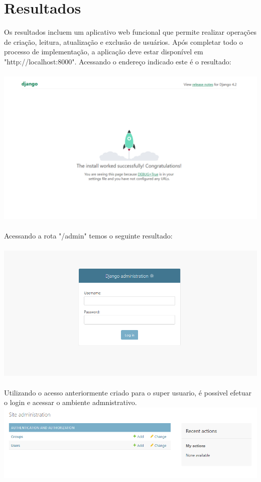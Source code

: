 \documentclass[11pt]{article} %
\begin{document}
\section{Resultados}
Os resultados incluem um aplicativo web funcional que permite  realizar operações de criação, leitura, atualização e exclusão de usuários.
Após completar todo o processo de implementação, a aplicação deve estar disponível em "http://localhost:8000". Acessando o endereço indicado este é o resultado:\\\\
\includegraphics[width=150mm,scale=0.7]{images/s9.png}\\\\
Acessando a rota "/admin" temos o seguinte resultado:\\\\
\includegraphics[width=150mm,scale=0.7]{images/s10.PNG}\\\\
Utilizando o acesso anteriormente criado para o super usuario, é possivel efetuar o login e acessar o ambiente admnistrativo.\\
\includegraphics[width=150mm,scale=0.7]{images/s11.PNG}
\end{document}
